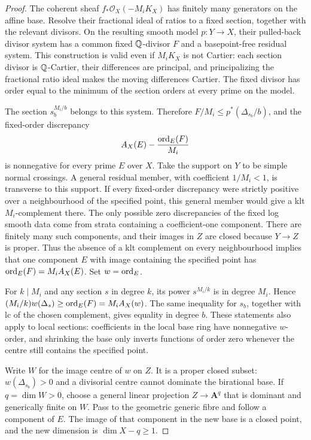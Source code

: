 \begin{proof}
The coherent sheaf $f_*\mathcal O_X(-M_iK_X)$ has finitely many
generators on the affine base.  Resolve their fractional ideal of ratios
to a fixed section, together with the relevant divisors.  On the resulting
smooth model $p:Y\to X$, their pulled-back divisor system has a common
fixed $\mathbb Q$-divisor $F$ and a basepoint-free residual system.  This
construction is valid even if $M_iK_X$ is not Cartier: each section divisor
is $\mathbb Q$-Cartier, their differences are principal, and principalizing the
fractional ratio ideal makes the moving differences Cartier.  The fixed
divisor has order equal to the minimum of the section orders at every
prime on the model.

The section $s_b^{M_i/b}$ belongs to this system.  Therefore
$F/M_i\le p^*(\Delta_{s_b}/b)$, and the fixed-order discrepancy
\[
 A_X(E)-\frac{\operatorname{ord}_E(F)}{M_i}
\]
is nonnegative for every prime $E$ over $X$.  Take the support on $Y$ to
be simple normal crossings.  A general residual member, with coefficient
$1/M_i<1$, is transverse to this support.  If every fixed-order
discrepancy were strictly positive over a neighbourhood of the specified
point, this general member would give a klt $M_i$-complement there.
The only possible zero discrepancies of the fixed log smooth data come
from strata containing a coefficient-one component.  There are finitely
many such components, and their images in $Z$ are closed because
$Y\to Z$ is proper.  Thus the absence of a klt complement on every
neighbourhood implies that one component $E$ with image containing the
specified point has
$\operatorname{ord}_E(F)=M_i A_X(E)$.  Set $w=\operatorname{ord}_E$.

For $k\mid M_i$ and any section $s$ in degree $k$, its power
$s^{M_i/k}$ is in degree $M_i$.  Hence
$(M_i/k)w(\Delta_s)\ge\operatorname{ord}_E(F)=M_i A_X(w)$.
The same inequality for $s_b$, together with lc of the chosen complement,
gives equality in degree $b$.  These statements also apply to local
sections: coefficients in the local base ring have nonnegative $w$-order,
and shrinking the base only inverts functions of order zero whenever
the centre still contains the specified point.

Write $W$ for the image centre of $w$ on $Z$.  It is a proper closed
subset: $w(\Delta_{s_b})>0$ and a divisorial centre cannot dominate the
birational base.  If $q=\dim W>0$, choose a general linear projection
$Z\to\mathbf A^q$ that is dominant and generically finite on $W$.
Pass to the geometric generic fibre and follow a component of $E$.
The image of that component in the new base is a closed point, and the
new dimension is $\dim X-q\ge1$.


\end{proof}
